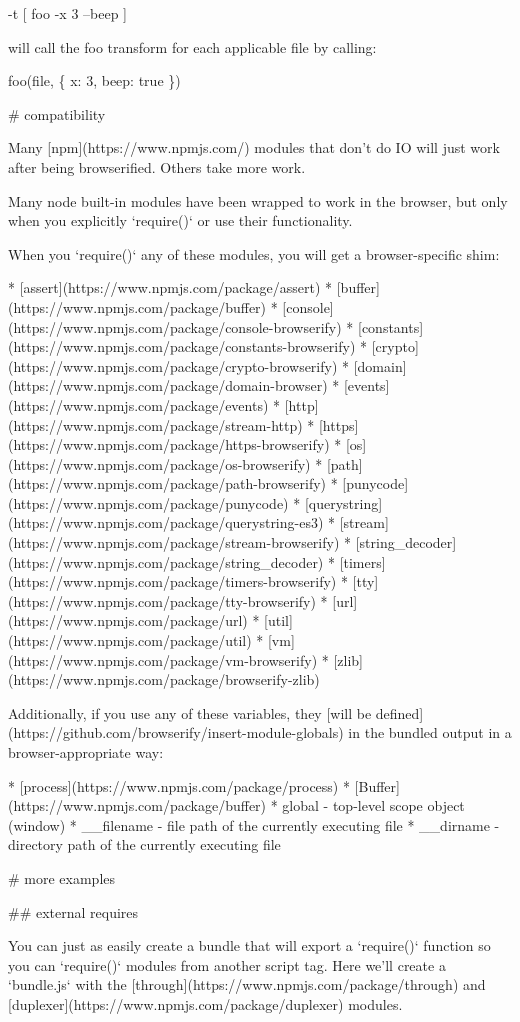 -\/t \mbox{[} foo -\/x 3 --beep \mbox{]}

will call the {\ttfamily foo} transform for each applicable file by calling\+:

foo(file, \{ x\+: 3, beep\+: true \})


\begin{DoxyCode}
# compatibility

Many [npm](https://www.npmjs.com/) modules that don't do IO will just work after being
browserified. Others take more work.

Many node built-in modules have been wrapped to work in the browser, but only
when you explicitly `require()` or use their functionality.

When you `require()` any of these modules, you will get a browser-specific shim:

* [assert](https://www.npmjs.com/package/assert)
* [buffer](https://www.npmjs.com/package/buffer)
* [console](https://www.npmjs.com/package/console-browserify)
* [constants](https://www.npmjs.com/package/constants-browserify)
* [crypto](https://www.npmjs.com/package/crypto-browserify)
* [domain](https://www.npmjs.com/package/domain-browser)
* [events](https://www.npmjs.com/package/events)
* [http](https://www.npmjs.com/package/stream-http)
* [https](https://www.npmjs.com/package/https-browserify)
* [os](https://www.npmjs.com/package/os-browserify)
* [path](https://www.npmjs.com/package/path-browserify)
* [punycode](https://www.npmjs.com/package/punycode)
* [querystring](https://www.npmjs.com/package/querystring-es3)
* [stream](https://www.npmjs.com/package/stream-browserify)
* [string\_decoder](https://www.npmjs.com/package/string\_decoder)
* [timers](https://www.npmjs.com/package/timers-browserify)
* [tty](https://www.npmjs.com/package/tty-browserify)
* [url](https://www.npmjs.com/package/url)
* [util](https://www.npmjs.com/package/util)
* [vm](https://www.npmjs.com/package/vm-browserify)
* [zlib](https://www.npmjs.com/package/browserify-zlib)

Additionally, if you use any of these variables, they
[will be defined](https://github.com/browserify/insert-module-globals)
in the bundled output in a browser-appropriate way:

* [process](https://www.npmjs.com/package/process)
* [Buffer](https://www.npmjs.com/package/buffer)
* global - top-level scope object (window)
* \_\_filename - file path of the currently executing file
* \_\_dirname - directory path of the currently executing file

# more examples

## external requires

You can just as easily create a bundle that will export a `require()` function so
you can `require()` modules from another script tag. Here we'll create a
`bundle.js` with the [through](https://www.npmjs.com/package/through)
and [duplexer](https://www.npmjs.com/package/duplexer) modules.
\end{DoxyCode}

